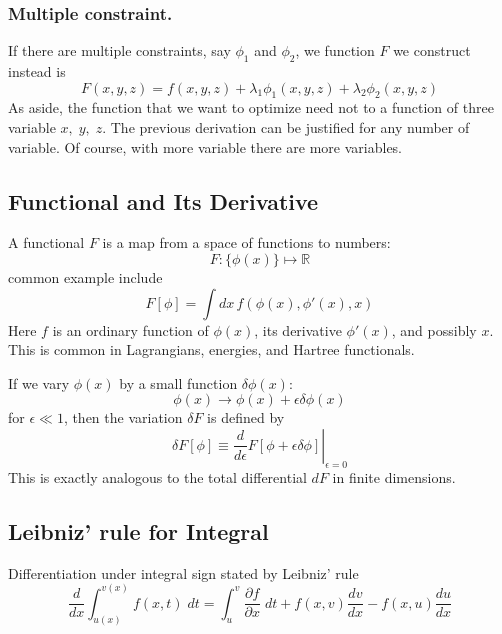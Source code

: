 \documentclass[../../../main.tex]{subfiles}
\begin{document}
\subsubsection{Multiple constraint.} If there are multiple constraints, say $\phi_1$ and $\phi_2$, we function $F$ we construct instead is
\begin{equation*}
    F(x,y,z)=f(x,y,z)+\lambda_1\phi_1(x,y,z)+\lambda_2\phi_2(x,y,z)
\end{equation*}
As aside, the function that we want to optimize need not to a function of three variable $x,\;y,\;z$. The previous derivation can be justified for any number of variable. Of course, with more variable there are more variables.

\subsection{Functional and Its Derivative}
A functional $F$ is a map from a space of functions to numbers:
\begin{equation*}
    F : \{ \phi(x) \} \mapsto \mathbb{R}
\end{equation*}
common example include 
\begin{equation*}
    F[\phi] = \int dx\, f(\phi(x), \phi'(x), x)
\end{equation*}
Here $f$ is an ordinary function of $\phi(x)$, its derivative $\phi'(x)$, and possibly $x$. 
This is common in Lagrangians, energies, and Hartree functionals.

If we vary $\phi(x)$ by a small function $\delta\phi(x)$: 
\begin{equation*}
    \phi(x) \rightarrow \phi(x) + \epsilon \delta\phi(x)
\end{equation*}
for $\epsilon \ll 1$, then the variation $\delta F$ is defined by
\begin{equation*}
    \delta F[\phi] \equiv \left. \frac{d}{d\epsilon} F[\phi + \epsilon \delta \phi] \right|_{\epsilon=0} 
\end{equation*}
This is exactly analogous to the total differential $dF$ in finite dimensions.


\subsection{Leibniz’ rule for Integral}
Differentiation under integral sign stated by Leibniz' rule
\begin{equation*}
    \frac{d}{dx}\int_{u(x)}^{v(x)}f(x,t)\;dt=\int_{u}^{v}\frac{\partial f}{\partial x}\;dt + f(x,v)\frac{dv}{dx}-f(x,u)\frac{du}{dx}
\end{equation*}
\end{document}
